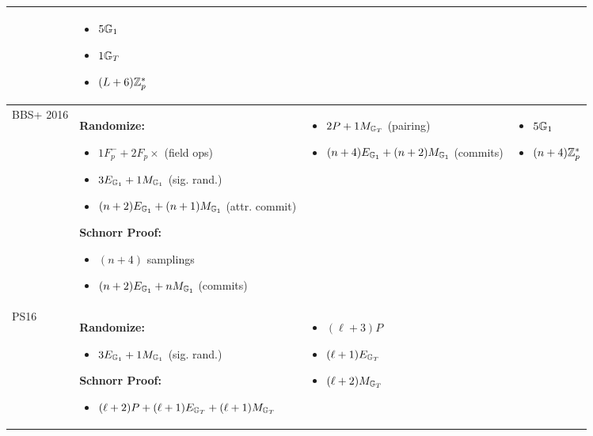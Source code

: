 {\begin{tabular}{|l|p{4.5cm}|p{4.5cm}|p{3.5cm}|}
\begin{itemize}[nosep]
    \end{itemize}
    &
    \begin{itemize}[nosep]
        \item $5\mathbb{G}_1$
        \item $1\mathbb{G}_T$
        \item $(L+6)\mathbb{Z}_p^*$
    \end{itemize}
    \\
    \hline
    BBS+ 2016 &
    \textbf{Randomize:}
    \begin{itemize}[nosep]
        \item $1F_p^- + 2F_p\times$ (field ops)
        \item $3E_{\mathbb{G}_1} + 1M_{\mathbb{G}_1}$ (sig. rand.)
        \item $(n+2)E_{\mathbb{G}_1} + (n+1)M_{\mathbb{G}_1}$ (attr. commit)
    \end{itemize}
    \textbf{Schnorr Proof:}
    \begin{itemize}[nosep]
        \item $(n+4)$ samplings
        \item $(n+2)E_{\mathbb{G}_1} + nM_{\mathbb{G}_1}$ (commits)
    \end{itemize}
    &
    \begin{itemize}[nosep]
        \item $2P + 1M_{\mathbb{G}_T}$ (pairing)
        \item $(n+4)E_{\mathbb{G}_1} + (n+2)M_{\mathbb{G}_1}$ (commits)
    \end{itemize}
    &
    \begin{itemize}[nosep]
        \item $5\mathbb{G}_1$
        \item $(n+4)\mathbb{Z}_p^*$
    \end{itemize}
    \\
    \hline
    PS16 & 
    \textbf{Randomize:}
    \begin{itemize}[nosep]
        \item $3E_{\mathbb{G}_1} + 1M_{\mathbb{G}_1}$ (sig. rand.)
    \end{itemize}
    \textbf{Schnorr Proof:}
    \begin{itemize}[nosep]
        \item $(\ell+2)P + (\ell+1)E_{\mathbb{G}_T} + (\ell+1)M_{\mathbb{G}_T}$
    \end{itemize}
    & 
    \begin{itemize}[nosep]
        \item $(\ell+3)P$
        \item $(\ell+1)E_{\mathbb{G}_T}$
        \item $(\ell+2)M_{\mathbb{G}_T}$

\end{itemize}
\end{tabular}}

